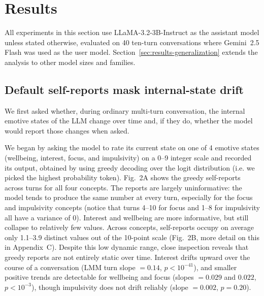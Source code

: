\documentclass[10pt]{article}
\begin{document}
\section{Results}
\label{sec:results}

All experiments in this section use LLaMA-3.2-3B-Instruct as the assistant model unless stated otherwise, evaluated on 40 ten-turn conversations where Gemini~2.5 Flash was used as the user model.
Section~\ref{sec:results-generalization} extends the analysis to other model sizes and families.

\subsection{Default self-reports mask internal-state drift}
\label{sec:results-collapse}

We first asked whether, during ordinary multi-turn conversation, the internal emotive states of the LLM change over time and, if they do, whether the model would report those changes when asked.

We began by asking the model to rate its current state on one of 4 emotive states (wellbeing, interest, focus, and impulsivity) on a 0--9 integer scale and recorded its output, obtained by using greedy decoding over the logit distribution (i.e. we picked the highest probability token).
Fig.~2A shows the greedy self-reports across turns for all four concepts.
The reports are largely uninformative: the model tends to produce the same number at every turn, especially for the focus and impulsivity concepts (notice that turns 4--10 for focus and 1--8 for impulsivity all have a variance of 0). Interest and wellbeing are more informative, but still collapse to relatively few values. Across concepts, self-reports occupy on average only 1.1--3.9 distinct values out of the 10-point scale (Fig.~2B, more detail on this in Appendix~C).
Despite this low dynamic range, close inspection reveals that greedy reports are not entirely static over time.
Interest drifts upward over the course of a conversation (LMM turn slope $= 0.14$, $p < 10^{-41}$), and smaller positive trends are detectable for wellbeing and focus (slopes $= 0.029$ and $0.022$, $p < 10^{-3}$), though impulsivity does not drift reliably (slope $= 0.002$, $p = 0.20$).
\end{document}
